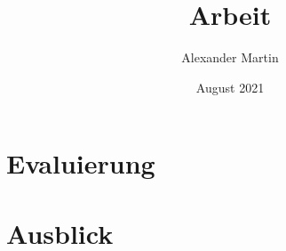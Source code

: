 \documentclass[11pt,titlepage]{book}
\title{Arbeit}
\author{Alexander Martin}
\date{August 2021}
\begin{document}

\newpage

\newpage

\newpage

\pagestyle{fancy}
\tableofcontents
\newpage






\chapter{Evaluierung}
\chapter{Ausblick}

\newpage

\printbibliography
\end{document}

